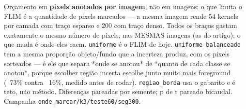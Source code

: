 \footnotesize Orçamento em \textbf{pixels anotados por imagem}, não em imagens: o que limita o FLIM é a quantidade de pixels marcados --- a mesma imagem rende 54 kernels por camada com traço esparso e 200 com traço denso. Todos os braços gastam exatamente o mesmo número de pixels, nas MESMAS imagens (as do artigo); o que muda é onde eles caem. \texttt{uniforme} é o FLIM de hoje. \texttt{uniforme\_balanceado} tem a mesma proporção objeto/fundo que a incerteza produz, com os pixels sorteados --- é ele que separa *onde se anotou* de *quanto de cada classe se anotou*, porque escolher região incerta escolhe junto muito mais foreground (~73\% contra ~16\%, medido antes de rodar). \texttt{regiao\_borda} usa o gabarito e é teto, não método. Diferenças pareadas por semente; p de t pareado bicaudal. Campanha \texttt{onde\_marcar/k3/teste60/seg300}.
\normalsize
